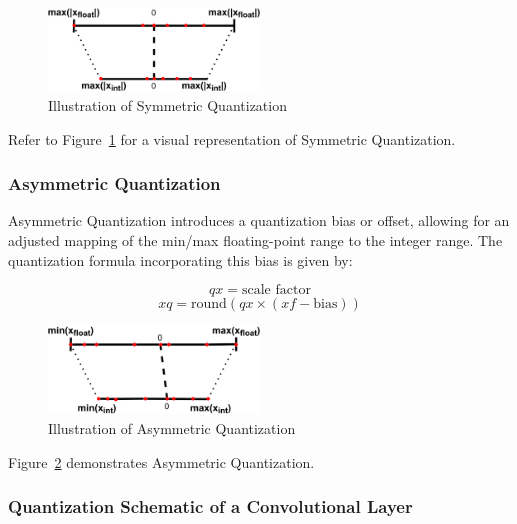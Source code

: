 \documentclass[10pt]{article}
\begin{document}
\begin{figure}[H]
\centering
\includegraphics[width=0.5\textwidth]{figures/symmetric_quant.png}
\caption{Illustration of Symmetric Quantization}
\label{fig:symmetric_quantization}
\end{figure}

Refer to Figure~\ref{fig:symmetric_quantization} for a visual representation of Symmetric Quantization.

\subsubsection{Asymmetric Quantization}

Asymmetric Quantization introduces a quantization bias or offset, allowing for an adjusted mapping of the min/max floating-point range to the integer range. The quantization formula incorporating this bias is given by:

\begin{equation}
    qx = \text{scale factor}
\end{equation}
\begin{equation}
    xq = \text{round}(qx \times (xf - \text{bias}))
\end{equation}

\begin{figure}[H]
\centering
\includegraphics[width=0.5\textwidth]{figures/asymmetric_quant.png}
\caption{Illustration of Asymmetric Quantization}
\label{fig:asymmetric_quantization}
\end{figure}

Figure~\ref{fig:asymmetric_quantization} demonstrates Asymmetric Quantization.

\subsubsection{Quantization Schematic of a Convolutional Layer}
\end{document}
